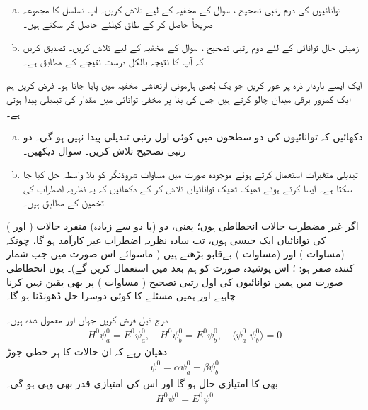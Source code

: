 \begin{enumerate}[a.]
\item
توانائیوں کی دوم رتبی تصحیح ، سوال  کے مخفیہ کے لیے تلاش کریں۔  آپ تسلسل کا مجموعہ صریحاً حاصل کر کے طاق  کیلئے  حاصل کر سکتے ہیں۔
\item
زمینی حال توانائی کے لئے دوم رتبی تصحیح ، سوال  کے مخفیہ کے لیے تلاش کریں۔ تصدیق کریں کہ آپ کا نتیجہ بالکل درست نتیجے کے مطابق ہے۔ 
\end{enumerate}
ایک ایسے باردار ذرہ پر غور کریں جو یک بُعدی ہارمونی ارتعاشی مخفیہ میں پایا جاتا ہو۔ فرض کریں ہم ایک کمزور برقی میدان  چالو کرتے ہیں جس کی بنا پر مخفی توانائی میں  مقدار کی تبدیلی پیدا ہوتی ہے۔
\begin{enumerate}[a.]
\item
دکھائیں کہ توانائیوں کی دو سطحوں میں کوئی اول رتبی تبدیلی پیدا نہیں ہو گی۔ دو رتبی تصحیح تلاش کریں۔ سوال  دیکھیں۔
\item
تبدیلی متغیرات  استعمال کرتے ہوئے موجودہ صورت میں مساوات شروڈنگر کو بلا واسطہ حل کیا جا سکتا ہے۔ ایسا کرتے ہوئے ٹھیک ٹھیک توانائیاں تلاش کر کے دکھائیں کہ یہ نظریہ اضطراب کی تخمین کے مطابق ہیں۔
\end{enumerate}




اگر غیر مضطرب حالات انحطاطی ہوں؛ یعنی، دو (یا دو سے زیادہ) منفرد حالات (  اور ) کی توانائیاں ایک جیسی ہوں، تب سادہ نظریہ اضطراب غیر کارآمد ہو گا، چونکہ  (مساوات ) اور  (مساوات ) بےقابو بڑھتے ہیں ( ماسوائے اس صورت میں جب شمار کنندہ صفر ہو: ؛ اس پوشیدہ صورت کو ہم بعد میں استعمال کریں گے)۔ یوں انحطاطی صورت میں ہمیں توانائیوں کی اول رتبی تصحیح ( مساوات ) پر بھی یقین نہیں کرنا چاہیے اور ہمیں مسئلے کا کوئی دوسرا حل ڈھونڈنا ہو گا۔


درج ذیل فرض کریں جہاں  اور  معمول شدہ ہیں۔
\begin{align}\label{مساوات_غیر_مضطرب_دو_پڑتا_اضطراب}
H^0 \psi_a^0 = E^0 \psi_a^0, \quad H^0 \psi_b^0 = E^0 \psi_b^0, \quad \langle \psi_a^0 | \psi_b^0 \rangle = 0
\end{align}
دھیان رہے کہ ان حالات کا ہر خطی جوڑ 
\begin{align}\label{مساوات_غیر_مضطرب_دو_پڑتا_عمومی}
\psi^0 = \alpha \psi_a^0 + \beta \psi_b^0
\end{align}
بھی  کا امتیازی حال ہو گا اور اس کی امتیازی قدر  بھی وہی ہو گی۔ 
\begin{align}\label{مساوات_غیر_مضطرب_دو_پڑتا_وہی_توانائی}
H^0 \psi^0 = E^0 \psi^0
\end{align}

